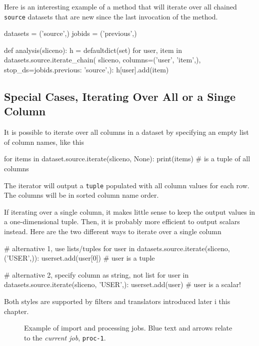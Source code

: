 Here is an interesting example of a method that will iterate over all
chained \texttt{source} datasets that are new since the last
invocation of the method.
\begin{python}
datasets = ('source',)
jobids = ('previous',)

def analysis(sliceno):
    h = defaultdict(set)
    for user, item in datasets.source.iterate_chain(
            sliceno,
            columns=('user', 'item',),
            stop_ds={jobids.previous: 'source',}):
        h[user].add(item)
\end{python}



\subsection*{Special Cases, Iterating Over All or a Singe Column}
It is possible to iterate over all columns in a dataset by specifying
an empty list of column names, like this
\begin{python}
for items in dataset.source.iterate(sliceno, None):
    print(items)  # is a tuple of all columns
\end{python}
The iterator will output a \texttt{tuple} populated with all column
values for each row.  The columns will be in sorted column name order.

If iterating over a single column, it makes little sense to keep the
output values in a one-dimensional tuple.  Then, it is probably more
efficient to output scalars instead.  Here are the two different ways
to iterate over a single column
\begin{python}
# alternative 1, use lists/tuples
for user in datasets.source.iterate(sliceno, ('USER',)):
    userset.add(user[0])  # user is a tuple

# alternative 2, specify column as string, not list
for user in datasets.source.iterate(sliceno, 'USER',):
    userset.add(user)     # user is a scalar!
\end{python}
Both styles are supported by filters and translators introduced later
i this chapter.



\begin{figure}[t!]
  \begin{center}
    
    \caption{Example of import and processing jobs.  Blue text and arrows relate to the \textsl{current job}, \texttt{proc-1}.}
    \label{fig:dsprocchain}
  \end{center}
\end{figure}




